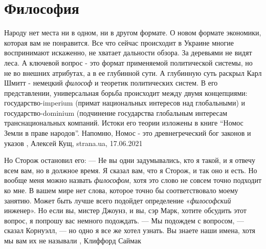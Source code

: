  
 
 
 
 
\chapter{Философия}
\label{sec:slova.filosofia}

Народу нет места ни в одном, ни в другом формате.  О новом формате экономики,
которая вам не понравится.  Все что сейчас происходит в Украине многие
воспринимают искаженно, не хватает дальности обзора.  За деревьями не видят
леса.  А ключевой вопрос - это формат применяемой политической системы, но не
во внешних атрибутах, а в ее глубинной сути.  А глубинную суть раскрыл Карл
Шмитт - немецкий \emph{философ} и теоретик политических систем.  В его
представлении, универсальная борьба происходит между двумя концепциями:
государство-imperium (примат национальных интересов над глобальными) и
государство-dominium (подчинение государства глобальным интересам
транснациональных компаний.  Истоки его теории изложены в книге \enquote{Номос
Земли в праве народов}. Напомню, Номос - это древнегреческий бог законов и
указов
, 
Алексей Кущ, strana.ua, 17.06.2021

Но Сторож остановил его: — Не вы одни задумывались, кто я такой, и я отвечу
всем вам, но в должное время. Я сказал вам, что я Сторож, и так оно и есть. Но
вообще меня можно назвать \emph{философом}, хотя это слово не совсем точно подходит ко
мне. В вашем мире нет слова, которое точно бы соответствовало моему занятию.
Может быть лучше всего подойдет определение «\emph{философский} инженер». Но если вы,
мистер Джоунз, и вы, сэр Марк, хотите обсудить этот вопрос, я попрошу вас
немного подождать.  — Мы подождем с вопросом, — сказал Корнуэлл, — но одно я
все же хотел узнать.  Вы знаете наши имена, хотя мы вам их не называли
, Клиффорд Саймак
